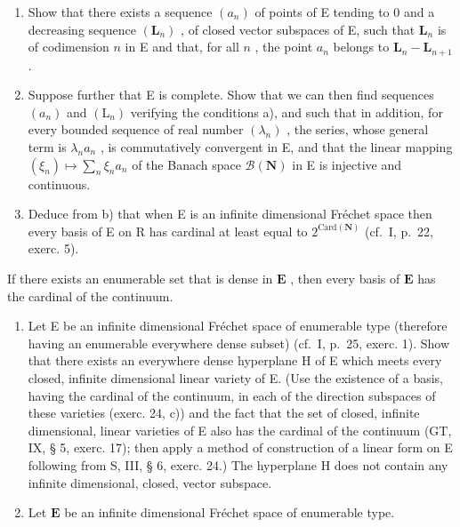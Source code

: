\begin{enumerate}
\def\labelenumi{\alph{enumi})}
\item
  Show that there exists a sequence \((a_{n})\) of points of E tending to 0 and a decreasing sequence \((\mathbf{L}_n)\) , of closed vector subspaces of E, such that \(\mathbf{L}_n\) is of codimension \(n\) in E and that, for all \(n\) , the point \(a_{n}\) belongs to \(\mathbf{L}_n - \mathbf{L}_{n + 1}\) .
\item
  Suppose further that E is complete. Show that we can then find sequences \((a_{n})\) and \((\mathrm{L}_{n})\) verifying the conditions a), and such that in addition, for every bounded sequence of real number \((\lambda_{n})\) , the series, whose general term is \(\lambda_{n}a_{n}\) , is commutatively convergent in E, and that the linear mapping \((\xi_{n})\mapsto\sum_{n}\xi_{n}a_{n}\) of the Banach space \(\mathcal{B}(\mathbf{N})\) in E is injective and continuous.
\item
  Deduce from b) that when E is an infinite dimensional Fréchet space then every basis of E on R has cardinal at least equal to \(2^{\mathrm{Card}(\mathbf{N})}\) (cf.~I, p.~22, exerc. 5).
\end{enumerate}

If there exists an enumerable set that is dense in \(\mathbf{E}\) , then every basis of \(\mathbf{E}\) has the cardinal of the continuum.

\begin{enumerate}
\def\labelenumi{\arabic{enumi})}
\setcounter{enumi}{24}
\item
  Let E be an infinite dimensional Fréchet space of enumerable type (therefore having an enumerable everywhere dense subset) (cf.~I, p.~25, exerc. 1). Show that there exists an everywhere dense hyperplane H of E which meets every closed, infinite dimensional linear variety of E. (Use the existence of a basis, having the cardinal of the continuum, in each of the direction subspaces of these varieties (exerc. 24, c)) and the fact that the set of closed, infinite dimensional, linear varieties of E also has the cardinal of the continuum (GT, IX, § 5, exerc. 17); then apply a method of construction of a linear form on E following from S, III, § 6, exerc. 24.) The hyperplane H does not contain any infinite dimensional, closed, vector subspace.
\item
  Let \(\mathbf{E}\) be an infinite dimensional Fréchet space of enumerable type.
\end{enumerate}

